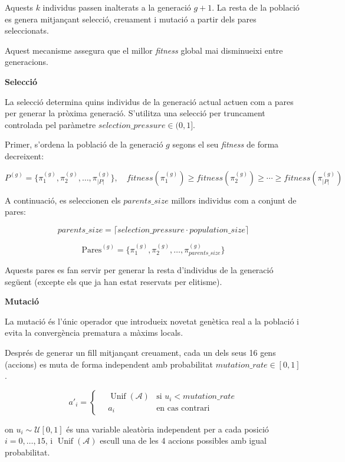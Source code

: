 \documentclass[12pt,a4paper]{report}
\begin{document}
Aquests $k$ individus passen inalterats a la generació $g+1$. La resta de la població es genera mitjançant
selecció, creuament i mutació a partir dels pares seleccionats.

Aquest mecanisme assegura que el millor \textit{fitness} global mai disminueixi entre generacions.

\textbf{Selecció}

La selecció determina quins individus de la generació actual actuen com a pares per generar la pròxima generació.
S'utilitza una selecció per truncament controlada pel paràmetre $\mathit{selection\_pressure} \in (0,1]$.

Primer, s'ordena la població de la generació $g$ segons el seu \textit{fitness} de forma decreixent:

\[
P^{(g)} = \bigl\{ \pi^{(g)}_1, \pi^{(g)}_2, \dots, \pi^{(g)}_{|P|} \bigr\}, \quad 
\mathit{fitness}(\pi^{(g)}_1) \geq \mathit{fitness}(\pi^{(g)}_2) \geq \cdots \geq \mathit{fitness}(\pi^{(g)}_{|P|})
\]

A continuació, es seleccionen els $\mathit{parents\_size}$ millors individus com a conjunt de pares:

\[
\mathit{parents\_size} = \lceil \mathit{selection\_pressure} \cdot \mathit{population\_size} \rceil
\]

\[
\text{Pares}^{(g)} = \bigl\{ \pi^{(g)}_1, \pi^{(g)}_2, \dots, \pi^{(g)}_{\mathit{parents\_size}} \bigr\}
\]

Aquests pares es fan servir per generar la resta d'individus de la generació següent (excepte els que ja han
estat reservats per elitisme).

\textbf{Mutació}

La mutació és l'únic operador que introdueix novetat genètica real a la població i evita la convergència
prematura a màxims locals.

Després de generar un fill mitjançant creuament, cada un dels seus 16 gens (accions) es muta de forma
independent amb probabilitat $\mathit{mutation\_rate} \in [0,1]$.

\[
a'_i =
\begin{cases}
\quad \operatorname{Unif}(\mathcal{A})  & \text{si } u_i < \mathit{mutation\_rate} \\
\quad a_i                                                  & \text{en cas contrari}
\end{cases}
\]

on $u_i \sim \mathcal{U}[0,1]$ és una variable aleatòria independent per a cada posició $i = 0,\dots,15$, i $\operatorname{Unif}(\mathcal{A})$ escull una de les 4 accions possibles amb igual probabilitat.
\end{document}
